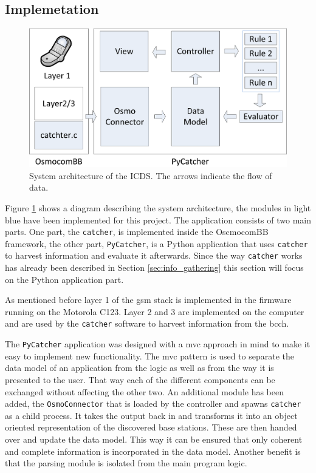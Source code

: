 \subsection{Implemetation}
\begin{figure}
\centering
\includegraphics{../Images/Architecture_software}
\caption{System architecture of the ICDS. The arrows indicate the flow of data.}
\label{fig:architecture}
\end{figure}
Figure \ref{fig:architecture} shows a diagram describing the system architecture, the modules in light blue have been implemented for this project.
The application consists of two main parts.
One part, the \texttt{catcher}, is implemented inside the OscmocomBB framework, the other part, \texttt{PyCatcher}, is a Python application that uses \texttt{catcher} to harvest information and evaluate it afterwards.
Since the way \texttt{catcher} works has already been described in Section \ref{sec:info_gathering} this section will focus on the Python application part.

As mentioned before layer 1 of the \gls{gsm} stack is implemented in the firmware running on the Motorola C123.
Layer 2 and 3 are implemented on the computer and are used by the \texttt{catcher} software to harvest information from the \gls{bcch}.

The \texttt{PyCatcher} application was designed with a \gls{mvc} approach in mind to make it easy to implement new functionality.
The \gls{mvc} pattern is used to separate the data model of an application from the logic as well as from the way it is presented to the user.
That way each of the different components can be exchanged without affecting the other two.
An additional module has been added, the \texttt{OsmoConnector} that is loaded by the controller and spawns \texttt{catcher} as a child process.
It takes the output back in and transforms it into an object oriented representation of the discovered base stations.
These are then handed over and update the data model.
This way it can be ensured that only coherent and complete information is incorporated in the data model.
Another benefit is that the parsing module is isolated from the main program logic.

